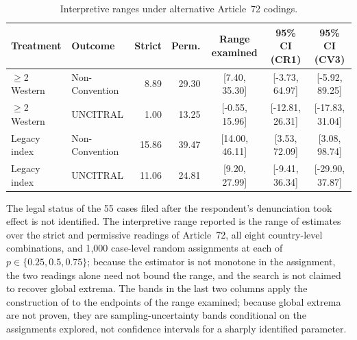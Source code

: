 \begin{table}[t]
\centering
\caption{Interpretive ranges under alternative Article~72 codings.}
\label{tab:bounds}
\small
\small
\setlength{\tabcolsep}{4pt}
\begin{tabular}{llrrccc}
\toprule
Treatment & Outcome & Strict & Perm. & Range examined & 95\% CI (CR1) & 95\% CI (CV3) \\
\midrule
$\geq$2 Western & Non-Convention & 8.89 & 29.30 & [7.40, 35.30] & [-3.73, 64.97] & [-5.92, 89.25] \\
$\geq$2 Western & UNCITRAL & 1.00 & 13.25 & [-0.55, 15.96] & [-12.81, 26.31] & [-17.83, 31.04] \\
Legacy index & Non-Convention & 15.86 & 39.47 & [14.00, 46.11] & [3.53, 72.09] & [3.08, 98.74] \\
Legacy index & UNCITRAL & 11.06 & 24.81 & [9.20, 27.99] & [-9.41, 36.34] & [-29.90, 37.87] \\
\bottomrule
\end{tabular}
\par\medskip
\begin{minipage}{0.95\linewidth}\footnotesize
The legal status of the 55 cases filed after the respondent's denunciation took effect is not identified. The interpretive range reported is the range of estimates over the strict and permissive readings of Article~72, all eight country-level combinations, and 1{,}000 case-level random assignments at each of $p\in\{0.25, 0.5, 0.75\}$; because the estimator is not monotone in the assignment, the two readings alone need not bound the range, and the search is not claimed to recover global extrema. The bands in the last two columns apply the construction of \citet{imbens2004} to the endpoints of the range examined; because global extrema are not proven, they are sampling-uncertainty bands conditional on the assignments explored, not confidence intervals for a sharply identified parameter.
\end{minipage}
\end{table}
